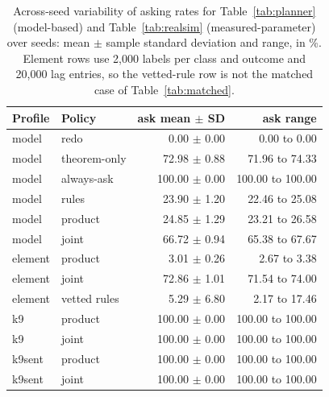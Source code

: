 \begin{table}[t]
\centering
\caption{Across-seed variability of asking rates for Table~\ref{tab:planner} (model-based) and Table~\ref{tab:realsim} (measured-parameter) over \SimSeedCount{} seeds: mean $\pm$ sample standard deviation and range, in \%. Element rows use 2{,}000 labels per class and outcome and 20{,}000 lag entries, so the vetted-rule row is not the matched case of Table~\ref{tab:matched}.}
\label{tab:seedvariance}
\small
\begin{tabular}{@{}llrr@{}}
\toprule
Profile & Policy & ask mean $\pm$ SD & ask range \\
\midrule
model & redo & 0.00 $\pm$ 0.00 & 0.00 to 0.00 \\
model & theorem-only & 72.98 $\pm$ 0.88 & 71.96 to 74.33 \\
model & always-ask & 100.00 $\pm$ 0.00 & 100.00 to 100.00 \\
model & rules & 23.90 $\pm$ 1.20 & 22.46 to 25.08 \\
model & product & 24.85 $\pm$ 1.29 & 23.21 to 26.58 \\
model & joint & 66.72 $\pm$ 0.94 & 65.38 to 67.67 \\
element & product & 3.01 $\pm$ 0.26 & 2.67 to 3.38 \\
element & joint & 72.86 $\pm$ 1.01 & 71.54 to 74.00 \\
element & vetted rules & 5.29 $\pm$ 6.80 & 2.17 to 17.46 \\
k9 & product & 100.00 $\pm$ 0.00 & 100.00 to 100.00 \\
k9 & joint & 100.00 $\pm$ 0.00 & 100.00 to 100.00 \\
k9sent & product & 100.00 $\pm$ 0.00 & 100.00 to 100.00 \\
k9sent & joint & 100.00 $\pm$ 0.00 & 100.00 to 100.00 \\
\bottomrule
\end{tabular}
\end{table}
